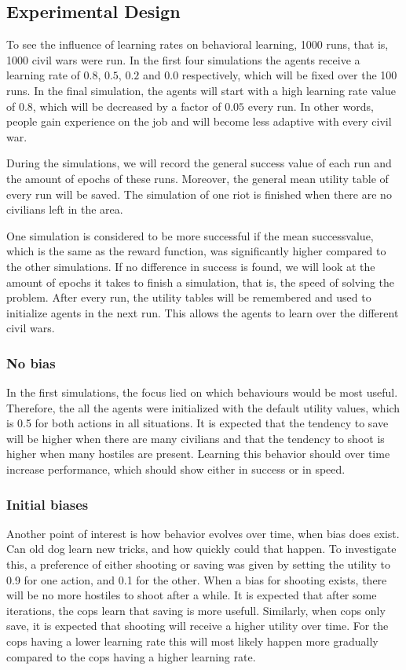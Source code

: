 \subsection{Experimental Design}
To see the influence of learning rates on behavioral learning, 1000 runs, that is, 1000 civil wars were run. In the first four simulations the agents receive a learning rate of $0.8$, $0.5$, $0.2$ and $0.0$ respectively, which will be fixed over the 100 runs. In the final simulation, the agents will start with a high learning rate value of $0.8$, which will be decreased by a factor of $0.05$ every run. In other words, people gain experience on the job and will become less adaptive with every civil war. 

During the simulations, we will record the general success value of each run and the amount of epochs of these runs. Moreover, the general mean utility table of every run will be saved. The simulation of one riot is finished when there are no civilians left in the area. 

One simulation is considered to be more successful if the mean successvalue, which is the same as the reward function, was significantly higher compared to the other simulations. If no difference in success is found, we will look at the amount of epochs it takes to finish a simulation, that is, the speed of solving the problem. After every run, the utility tables will be remembered and used to initialize agents in the next run. This allows the agents to learn over the different civil wars. 

\subsubsection{No bias}
In the first simulations, the focus lied on which behaviours would be most useful. Therefore, the all the agents were initialized with the default utility values, which is 0.5 for both actions in all situations. It is expected that the tendency to save will be higher when there are many civilians and that the tendency to shoot is higher when many hostiles are present. Learning this behavior should over time increase performance, which should show either in success or in speed. 

\subsubsection{Initial biases}
Another point of interest is how behavior evolves over time, when bias does exist. Can old dog learn new tricks, and how quickly could that happen. To investigate this, a preference of either shooting or saving was given by setting the utility to 0.9 for one action, and 0.1 for the other. When a bias for shooting exists, there will be no more hostiles to shoot after a while. It is expected that after some iterations, the cops learn that saving is more usefull. Similarly, when cops only save, it is expected that shooting will receive a higher utility over time. For the cops having a lower learning rate this will most likely happen more gradually compared to the cops having a higher learning rate.

